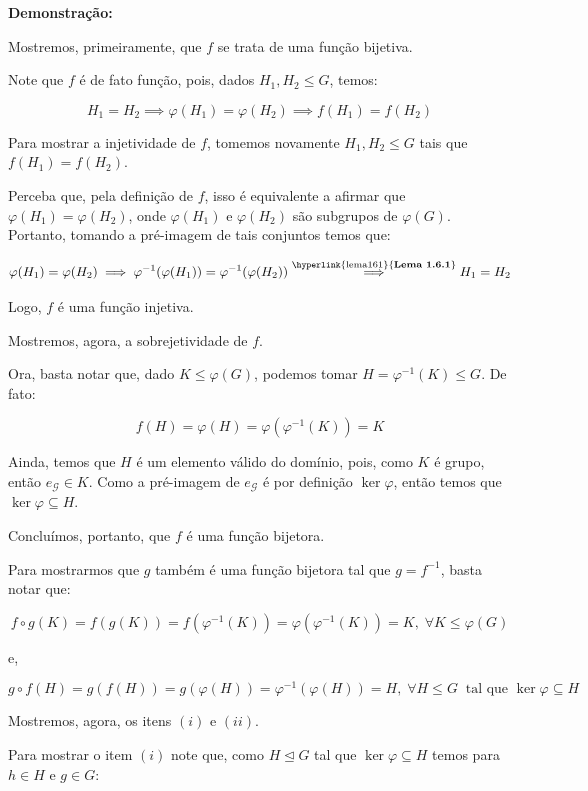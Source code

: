 \documentclass[16pt,openany]{book}
\theoremstyle{definition}
\begin{document}
{\color{red}

\textbf{Demonstração:}

Mostremos, primeiramente, que $f$ se trata de uma função bijetiva. 

Note que $f$ é de fato função, pois, dados $H_1, H_2\leq G$, temos:

\[
H_1 = H_2 \implies \varphi(H_1) = \varphi(H_2) \implies f(H_1) = f(H_2)
\]

Para mostrar a injetividade de $f$, tomemos novamente $H_1,H_2\leq G$ tais que $f(H_1) = f(H_2)$.

Perceba que, pela definição de $f$, isso é equivalente a afirmar que $\varphi(H_1) = \varphi(H_2)$, onde $\varphi(H_1)$ e $\varphi(H_2)$ são subgrupos de $\varphi(G)$. Portanto, tomando a pré-imagem de tais conjuntos temos que:

\[
\varphi(H_1) = \varphi(H_2) \implies \varphi^{-1}(\varphi(H_1)) = \varphi^{-1}(\varphi(H_2)) \overset{\text{\hyperlink{lema161}{\textbf{Lema 1.6.1}}}}{\implies} H_1 = H_2 
\]

Logo, $f$ é uma função injetiva. 

Mostremos, agora, a sobrejetividade de $f$. 

Ora, basta notar que, dado $K\leq \varphi(G)$, podemos tomar $H = \varphi^{-1}(K) \leq G$. De fato:

\[
f(H) = \varphi(H) = \varphi(\varphi^{-1}(K)) = K
\]

Ainda, temos que $H$ é um elemento válido do domínio, pois, como $K$ é grupo, então $e_\mathcal{G}\in K$. Como a pré-imagem de $e_\mathcal{G}$ é por definição $\ker{\varphi}$, então temos que $\ker{\varphi}\subseteq H$.

Concluímos, portanto, que $f$ é uma função bijetora.

Para mostrarmos que $g$ também é uma função bijetora tal que $g = f^{-1}$, basta notar que:

\[
f\circ g (K) = f(g(K)) = f(\varphi^{-1}(K)) = \varphi(\varphi^{-1}(K)) = K,\; \forall K\leq \varphi(G) 
\]

e,

\[
g\circ f (H) = g(f(H)) = g(\varphi(H)) = \varphi^{-1}(\varphi(H)) = H,\; \forall H\leq G \;\; \text{tal que } \ker{\varphi}\subseteq H
\]

Mostremos, agora, os itens $(i)$ e $(ii)$.

Para mostrar o item $(i)$ note que, como $H\trianglelefteq G$ tal que $\ker{\varphi} \subseteq H$ temos para $h\in H$ e $g\in G$:

}
\end{document}
